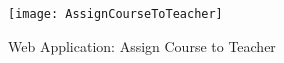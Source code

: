 \begin{figure}[h]
  \centering
  \texttt{[image: AssignCourseToTeacher]}
  \caption{Web Application: Assign Course to Teacher}
\end{figure}


























































































